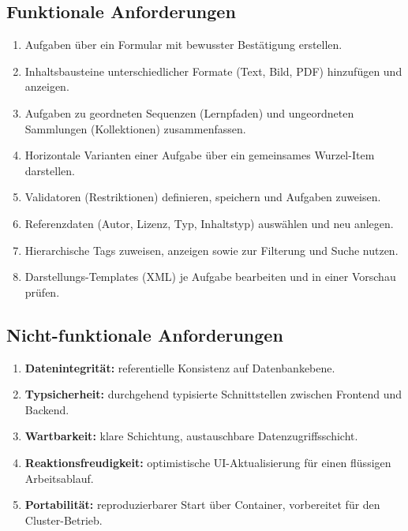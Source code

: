 \documentclass[11pt,a4paper]{article}
\begin{document}
\subsection{Funktionale Anforderungen}
\begin{enumerate}[label=\textbf{F\arabic*}]
  \item Aufgaben über ein Formular mit bewusster Bestätigung erstellen.
  \item Inhaltsbausteine unterschiedlicher Formate (Text, Bild, PDF) hinzufügen
  und anzeigen.
  \item Aufgaben zu geordneten Sequenzen (Lernpfaden) und ungeordneten
  Sammlungen (Kollektionen) zusammenfassen.
  \item Horizontale Varianten einer Aufgabe über ein gemeinsames Wurzel-Item
  darstellen.
  \item Validatoren (Restriktionen) definieren, speichern und Aufgaben zuweisen.
  \item Referenzdaten (Autor, Lizenz, Typ, Inhaltstyp) auswählen und neu anlegen.
  \item Hierarchische Tags zuweisen, anzeigen sowie zur Filterung und Suche
  nutzen.
  \item Darstellungs-Templates (XML) je Aufgabe bearbeiten und in einer Vorschau
  prüfen.
\end{enumerate}

\subsection{Nicht-funktionale Anforderungen}
\begin{enumerate}[label=\textbf{N\arabic*}]
  \item \textbf{Datenintegrität:} referentielle Konsistenz auf Datenbankebene.
  \item \textbf{Typsicherheit:} durchgehend typisierte Schnittstellen zwischen
  Frontend und Backend.
  \item \textbf{Wartbarkeit:} klare Schichtung, austauschbare Datenzugriffsschicht.
  \item \textbf{Reaktionsfreudigkeit:} optimistische UI-Aktualisierung für einen
  flüssigen Arbeitsablauf.
  \item \textbf{Portabilität:} reproduzierbarer Start über Container, vorbereitet
  für den Cluster-Betrieb.
\end{enumerate}
\end{document}
